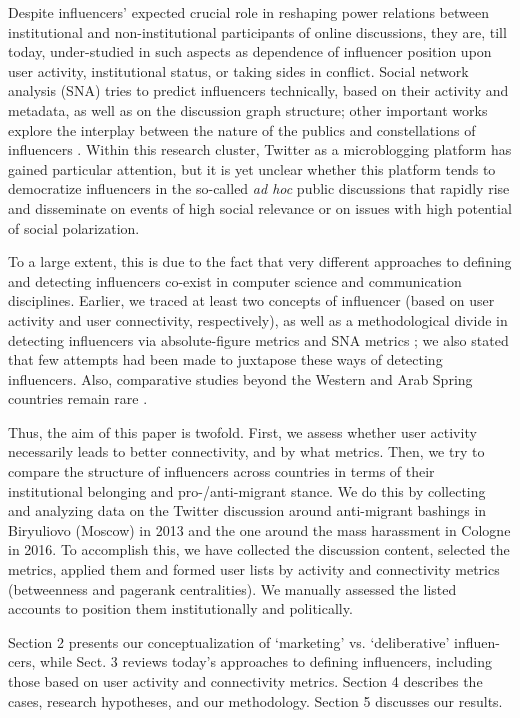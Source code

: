 Despite influencers’ expected crucial role in reshaping power relations between institutional and non-institutional participants of online discussions, they are, till today, under-studied in such aspects as dependence of influencer position upon user activity, institutional status, or taking sides in conflict. Social network analysis (SNA) tries to predict influencers technically, based on their activity and metadata, as well as on the discussion graph structure; other important works explore the interplay between the nature of the publics and constellations of influencers \cite{Habermas,Dahlgren,BrunsBurgess,Papacharissi,BrunsHighfeld2016}. Within this research cluster, Twitter as a microblogging platform has gained particular attention, but it is yet unclear whether this platform tends to democratize influencers in the so-called \textit{ad hoc} public discussions that rapidly rise and disseminate on events of high social relevance or on issues with high potential of social polarization.

To a large extent, this is due to the fact that very different approaches to defining and detecting influencers co-exist in computer science and communication disciplines. Earlier, we traced at least two concepts of influencer (based on user activity and user connectivity, respectively), as well as a methodological divide in detecting influencers via absolute-figure metrics and SNA metrics \cite{BodrunovaLitvinenkoBlekanov2016}; we also stated that few attempts had been made to juxtapose these ways of detecting influencers. Also, comparative studies beyond the Western and Arab Spring countries remain rare \cite{HladikStetka}.

Thus, the aim of this paper is twofold. First, we assess whether user activity necessarily leads to better connectivity, and by what metrics. Then, we try to compare the structure of influencers across countries in terms of their institutional belonging and pro-/anti-migrant stance. We do this by collecting and analyzing data on the Twitter discussion around anti-migrant bashings in Biryuliovo (Moscow) in 2013 and the one around the mass harassment in Cologne in 2016. To accomplish this, we have collected the discussion content, selected the metrics, applied them and formed user lists by activity and connectivity metrics (betweenness and pagerank centralities). We manually assessed the listed accounts to position them institutionally and politically.

Section 2 presents our conceptualization of ‘marketing’ vs. ‘deliberative’ influen- cers, while Sect. 3 reviews today’s approaches to defining influencers, including those based on user activity and connectivity metrics. Section 4 describes the cases, research hypotheses, and our methodology. Section 5 discusses our results.

